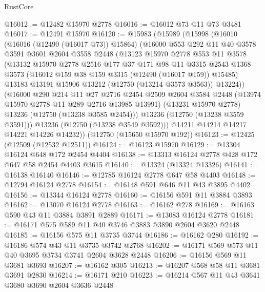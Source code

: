 \begin{lexlean}{RustCore}
\begin{coremodule}
@16012 := @12482 @15970 @2778
@16016 := @16012 @73 @11 @73 @3481
@16017 := @12491 @15970
@16120 := @15983
    (@15989
      (@15998
        (@16010
          (@16016 (@12490 (@16017 @73)) @15864)
          (@16000
            @553
            @292
            @11
            @40
            @3578
            @3591
            @3601
            @2604
            @3558
            @2448
            (@13123
              @15970
              @2778
              @553
              @11
              @3578
              (@13132
                @15970
                @2778
                @2516
                @177
                @37
                @171
                @98
                @11
                @3315
                @2543
                @1368
                @3573
                (@16012 @159 @38 @159 @3315 (@12490 (@16017 @159)) @15485)
                @13183
                @13191
                @15906
                @13212
                (@12750 (@13214 @3573 @3563))
                @13224))
            (@16000
              @290
              @214
              @11
              @27
              @2716
              @2454
              @2509
              @2604
              @3584
              @2448
              (@13974 @15970 @2778 @11 @289 @2716 @13985 @13991)
              (@13231 @15970 @2778)
              @13236
              (@12750 (@13238 @3585 @2454)))
            @13236
            (@12750 (@13238 @3559 @3591)))
          @13236
          (@12750 (@13238 @3549 @3592)))
        @14211
        @14214
        @14217
        @14221
        @14226
        @14232))
    (@12750 (@15650 @15970 @192))
@16123 := @12425 (@12509 (@12532 @12511))
@16124 := @16123 @15970
@16129 := @13304 @16124 @648 @172 @2454 @4404
@16138 := @13313 @16124 @2778 @428 @172 @647 @58 @2454 @4403 @3615
@16140 := @13324 (@13324 @13326)
@16141 := @16138 @16140
@16146 := @12785 @16124 @2778 @647 @58 @4403
@16148 := @12794 @16124 @2778
@16154 := @16148 @591 @646 @11 @43 @3895 @4402
@16156 := @13344 @16124 @2778
@16160 := @16156 @591 @11 @3884 @3893
@16162 := @13070 @16124 @2778
@16163 := @16162 @278
@16169 := @16163 @590 @43 @11 @3884 @3891 @2889
@16171 := @13083 @16124 @2778
@16181 := @16171 @575 @589 @11 @40 @3746 @3883 @3890 @2604 @3620 @2448
@16185 := @16156 @575 @11 @3735 @3744
@16186 := @16162 @280
@16192 := @16186 @574 @43 @11 @3735 @3742 @2768
@16202 := @16171 @569 @573 @11 @40 @3695 @3734 @3741 @2604 @3628 @2448
@16206 := @16156 @569 @11 @3681 @3693
@16207 := @16162 @305
@16213 := @16207 @568 @58 @11 @3681 @3691 @2830
@16214 := @16171 @210
@16223 := @16214 @567 @11 @43 @3641 @3680 @3690 @2604 @3636 @2448

\end{coremodule}
\end{lexlean}
